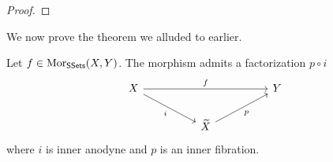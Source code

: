 \begin{lemma}\label{lem: small object argument}
  
\end{lemma}
\begin{proof}
  
\end{proof}
We now prove the theorem we alluded to earlier. 
\begin{theorem}\label{thm: maps of ssets factorize}
  Let $f\in\mathrm{Mor}_{\mathsf{SSets}}(X,Y)$. The morphism admits a factorization $p\circ i$
  $$%
  \begin{tikzcd}
    X && {} && Y \\
    && {\widetilde{X}}
    \arrow["i"', from=1-1, to=2-3]
    \arrow["p"', from=2-3, to=1-5]
    \arrow["f", from=1-1, to=1-5]
  \end{tikzcd}$$
  where $i$ is inner anodyne and $p$ is an inner fibration. 
\end{theorem}
